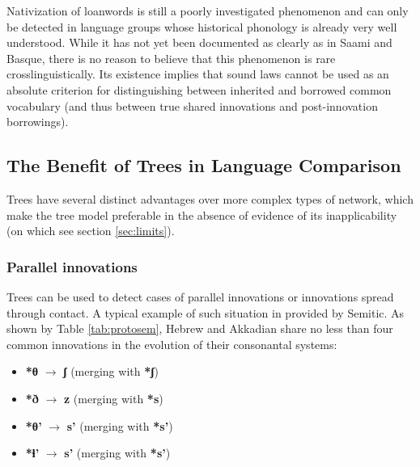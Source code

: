 \documentclass[svgnames,12pt]{scrartcl}
\newcommand{\ipa}[1]{\textbf{{\phon\mbox{#1}}}}
\begin{document}
Nativization of loanwords is still a poorly investigated phenomenon and can only be detected in language groups whose historical phonology is already very well understood. While it has not yet been documented as clearly as in Saami and Basque, there is no reason to believe that this phenomenon is rare crosslinguistically. Its existence implies that sound laws cannot be used as an absolute criterion for distinguishing between inherited and borrowed common vocabulary (and thus between true shared innovations and post-innovation borrowings).

 
\subsection{The Benefit of Trees in Language Comparison}
Trees have several distinct advantages over more complex types of network, which make the tree model preferable in the absence of evidence of its inapplicability (on which see section \ref{sec:limits}).

\subsubsection{Parallel innovations}
Trees can be used to detect cases of parallel innovations or innovations spread through contact. A typical example of such situation in provided by Semitic. As shown by Table \ref{tab:protosem}, Hebrew and Akkadian share no less than four common innovations in the evolution of their consonantal systems: 
\begin{itemize}
\item \ipa{*θ} $\rightarrow$ \ipa{ʃ} (merging with \ipa{*ʃ})
\item \ipa{*ð} $\rightarrow$ \ipa{z} (merging with \ipa{*s})
\item \ipa{*θ'} $\rightarrow$ \ipa{s'} (merging with \ipa{*s'})
\item \ipa{*ɬ'} $\rightarrow$ \ipa{s'} (merging with \ipa{*s'})
\end{itemize}
\end{document}
